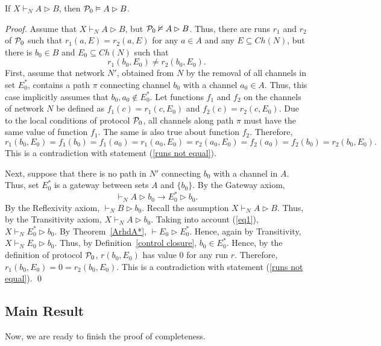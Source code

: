\documentclass{llncs}
\newcommand{\pp}{{\cal P}}
\newcommand{\gateway}{Gateway }
\begin{document}
\begin{theorem}\label{th2}
If $X \vdash_N A\rhd B$, then $\pp_0 \vDash A\rhd B$. 
\end{theorem}
\begin{proof}
Assume that $X \vdash_N A\rhd B$, but $\pp_0 \nvDash A\rhd B$. Thus, there are runs $r_1$ and $r_2$ of $\pp_0$ such that $r_1(a,E)=r_2(a,E)$ for any $a\in A$ and any $E\subseteq Ch(N)$, but there is $b_0\in B$ and $E_0\subseteq Ch(N)$
such that 
\begin{equation}\label{runs not equal}
r_1(b_0,E_0) \neq r_2(b_0,E_0).
\end{equation}
First, assume that network $N'$, obtained from $N$ by the removal of all channels in set $E^*_0$, contains a path $\pi$ connecting channel $b_0$ with a channel $a_0\in A$. Thus, this case implicitly assumes that $b_0,a_0\notin E^*_0$. Let functions $f_1$ and $f_2$ on the channels of network $N$ be defined as $f_1(c)=r_1(c,E_0)$ and $f_2(c)=r_2(c,E_0)$. Due to the local conditions of protocol $\pp_0$, all channels along path $\pi$  must have the same value  of function $f_1$. The same is also true about function $f_2$. Therefore,
$
r_1(b_0,E_0) = f_1(b_0)=f_1(a_0)=r_1(a_0,E_0)=r_2(a_0,E_0)=f_2(a_0)=f_2(b_0)=r_2(b_0,E_0).
$
This is a contradiction with statement (\ref{runs not equal}).

Next, suppose that there is no path in $N'$ connecting $b_0$ with a channel in $A$. Thus, set $E^*_0$ is a gateway between sets $A$ and $\{b_0\}$. By the \gateway axiom,
\begin{equation}\label{eq1}
\vdash_N A\rhd b_0 \rightarrow E^*_0 \rhd b_0.
\end{equation}
By the Reflexivity axiom, $\vdash_N B\rhd b_0$. Recall the assumption $X \vdash_N A\rhd B$. Thus, by the Transitivity axiom, $X \vdash_N A\rhd b_0$. Taking into account (\ref{eq1}), $X \vdash_N E_0^*\rhd b_0$. By Theorem~\ref{ArhdA*}, $\vdash E_0\rhd E^*_0$. Hence, again by Transitivity, 
$X \vdash_N E_0\rhd b_0$. Thus, by Definition~\ref{control closure}, $b_0 \in E_0^*$. Hence, by the definition of protocol $\pp_0$, $r(b_0,E_0)$ has value 0 for any run $r$. Therefore, $r_1(b_0,E_0)=0=r_2(b_0,E_0)$. This is a contradiction with statement (\ref{runs not equal}).
\qed 
\end{proof}

\subsection{Main Result}
Now, we are ready to finish the proof of completeness.
\end{document}
